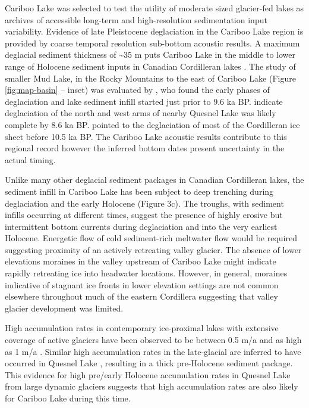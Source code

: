 \documentclass[Royal,times,doublespace,sageh]{sagej}
\begin{document}
Cariboo Lake was selected to test the utility of moderate sized
glacier-fed lakes as archives of accessible long-term and
high-resolution sedimentation input variability. Evidence of late
Pleistocene deglaciation in the Cariboo Lake region is provided by
coarse temporal resolution sub-bottom acoustic results. A maximum
deglacial sediment thickness of \textasciitilde35 m puts Cariboo Lake in
the middle to lower range of Holocene sediment inputs in Canadian
Cordilleran lakes \citep[see detailed discussion in][]{Gilbert2012}. The
study of smaller Mud Lake, in the Rocky Mountains to the east of Cariboo
Lake (Figure \ref{fig:map-basin} -- inset) was evaluated by
\citet{Hodder2006}, who found the early phases of deglaciation and lake
sediment infill started just prior to 9.6 ka BP. \citet{Gilbert2012}
indicate deglaciation of the north and west arms of nearby Quesnel Lake
was likely complete by 8.6 ka BP. \citet{Menounos2009b} pointed to the
deglaciation of most of the Cordilleran ice sheet before 10.5 ka BP. The
Cariboo Lake acoustic results contribute to this regional record however
the inferred bottom dates present uncertainty in the actual timing.

Unlike many other deglacial sediment packages in Canadian Cordilleran
lakes, the sediment infill in Cariboo Lake has been subject to deep
trenching during deglaciation and the early Holocene (Figure 3c). The
troughs, with sediment infills occurring at different times, suggest the
presence of highly erosive but intermittent bottom currents during
deglaciation and into the very earliest Holocene. Energetic flow of cold
sediment-rich meltwater flow would be required suggesting proximity of
an actively retreating valley glacier. The absence of lower elevations
moraines in the valley upstream of Cariboo Lake might indicate rapidly
retreating ice into headwater locations. However, in general, moraines
indicative of stagnant ice fronts in lower elevation settings are not
common elsewhere throughout much of the eastern Cordillera suggesting
that valley glacier development was limited.

High accumulation rates in contemporary ice-proximal lakes with
extensive coverage of active glaciers have been observed to be between
0.5 m/a \citep{Crookshanks2008} and as high as 1 m/a
\citep{Gilbert1997}. Similar high accumulation rates in the late-glacial
are inferred to have occurred in Quesnel Lake \citep{Gilbert2012},
resulting in a thick pre-Holocene sediment package. This evidence for
high pre/early Holocene accumulation rates in Quesnel Lake from large
dynamic glaciers suggests that high accumulation rates are also likely
for Cariboo Lake during this time.
\end{document}
